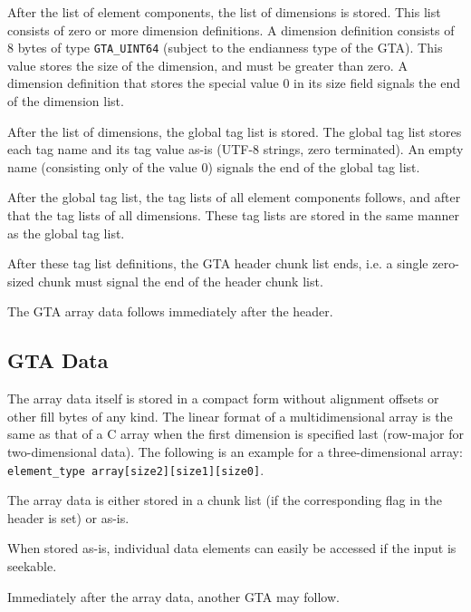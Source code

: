 \documentclass[a4paper,11pt]{article}
\newcommand{\code}[1]{\texttt{#1}}
\begin{document}
After the list of element components, the list of dimensions is stored.  This
list consists of zero or more dimension definitions. A dimension definition
consists of 8 bytes of type \code{GTA\_UINT64} (subject to the endianness type
of the GTA). This value stores the size of the dimension, and must be greater
than zero. A dimension definition that stores the special value 0 in its size
field signals the end of the dimension list.

After the list of dimensions, the global tag list is stored.  The global tag
list stores each tag name and its tag value as-is (\mbox{UTF-8} strings, zero
terminated). An empty name (consisting only of the value 0) signals
the end of the global tag list.

After the global tag list, the tag lists of all element components follows, and
after that the tag lists of all dimensions. These tag lists are stored in the
same manner as the global tag list.

After these tag list definitions, the GTA header chunk list ends, i.e. a
single zero-sized chunk must signal the end of the header chunk list.

The GTA array data follows immediately after the header.


\subsection{GTA Data}
\label{sec:gta-data}

The array data itself is stored in a compact form without alignment offsets or
other fill bytes of any kind. The linear format of a multidimensional array is
the same as that of a C array when the first dimension is specified last
(row-major for two-dimensional data). The following is an example for a
three-dimensional array: \code{element\_type array[size2][size1][size0]}.

The array data is either stored in a chunk list (if the corresponding flag in
the header is set) or as-is.

When stored as-is, individual data elements can easily be accessed if the input
is seekable.

Immediately after the array data, another GTA may follow.



%
\end{document}
